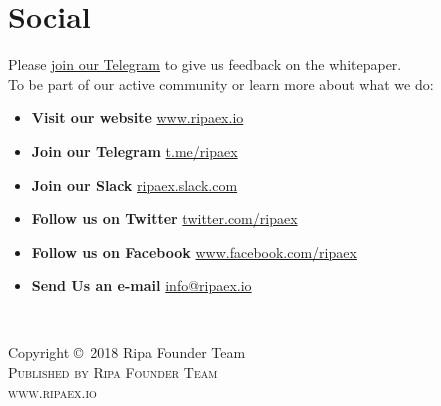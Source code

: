 \documentclass[11pt,fleqn,oneside]{book} %
\begin{document}
\section{Social}
\label{sec:social}
Please \href{https://t.me/ripaex}{join our Telegram} to give us feedback on the whitepaper.\\

To be part of our active community or learn more about what we do:
\begin{itemize}
	\item \textbf{Visit our website} \href{https://www.ripaex.io}{\faHome \hspace{0.2cm} www.ripaex.io} 
	\item \textbf{Join our Telegram} \href{https://t.me/ripaex}{\faSend \hspace{0.2cm} t.me/ripaex}
	\item \textbf{Join our Slack} \href{https://join.slack.com/t/ripaex/shared_invite/enQtMzM4NzUwNjU4OTQ0LTY3MDJmMTdhYTNlZjJlNGUxNzM1YjUwYjgyYjZlMDJmOTg3NTIzNThmNTYyMGQ3ODBkOTRmYzk3Y2Y4MzBkOTY}{\faSlack \hspace{0.2cm} ripaex.slack.com}
	\item \textbf{Follow us on Twitter} \href{https://twitter.com/ripaex}{\faTwitter \hspace{0.2cm} twitter.com/ripaex}
	\item \textbf{Follow us on Facebook} \href{https://www.facebook.com/ripaex}{\faFacebook \hspace{0.2cm} www.facebook.com/ripaex}
	\item \textbf{Send Us an e-mail} \href{mailto:info@ripaex.io}{\faInternetExplorer \hspace{0.2cm} info@ripaex.io}
\end{itemize}



\newpage
~\vfill
\thispagestyle{empty}

\noindent Copyright \copyright\ 2018 Ripa Founder Team\\ %

\noindent \textsc{Published by Ripa Founder Team}\\ %

\noindent \textsc{www.ripaex.io}\\ %
\end{document}
